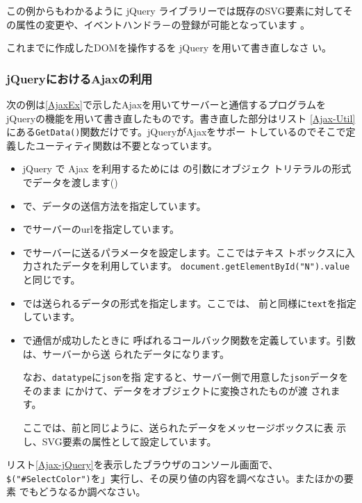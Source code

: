 この例からもわかるように jQuery ライブラリーでは既存のSVG要素に対してそ
の属性の変更や、イベントハンドラ－の登録が可能となっています
\iffalse\footnote{\Operan や\FF で確認したところではSVGの要素を指定して、新規に
オブジェクトを作成することはできますが、それをSVG要素として表示すること
はできませんでした。一部の属性はCSSの方で定義されてしまいました。これは
要素を作成するときの名前空間がHTMLにしか適応していないためと思われま
す。}\fi 。
\begin{Problem}\upshape
 これまでに作成したDOMを操作する\HTML を jQuery を用いて書き直しなさ
 い。
\end{Problem}
\subsubsection{jQueryにおけるAjaxの利用}
次の例は\ref{AjaxEx}で示したAjaxを用いてサーバーと通信するプログラムを
jQueryの機能を用いて書き直したものです。書き直した部分はリスト
\ref{Ajax-Util}にある\texttt{GetData()}関数だけです。jQueryがAjaxをサポー
トしているのでそこで定義したユーティティ関数は不要となっています。

\begin{itemize}
 \item jQuery で Ajax を利用するためには  の引数にオブジェク
			 トリテラルの形式でデータを渡します()
 \item {}で、データの送信方法を指定しています。
 \item {}でサーバーのurlを指定しています。
 \item {}でサーバーに送るパラメータを設定します。ここではテキス
			 トボックスに入力されたデータを利用しています。
			 \texttt{document.getElementById("N").value}と同じです。
 \item {}では送られるデータの形式を指定します。ここでは、
			 前と同様に\texttt{text}を指定しています。

 \item {}で通信が成功したときに
			 呼ばれるコールバック関数を定義しています。引数は、サーバーから送
			 られたデータになります。
			 
			 なお、\texttt{datatype}に\texttt{json}を指
			 定すると、サーバー側で用意した\texttt{json}データをそのまま
			 にかけて、データをオブジェクトに変換されたものが渡
			 されます。

			 ここでは、前と同じように、送られたデータをメッセージボックスに表
			 示し、SVG要素の属性として設定しています。
\end{itemize}
\begin{Problem}\upshape
リスト\ref{Ajax-jQuery}を表示したブラウザのコンソール画面で、
 \texttt{\$("\#SelectColor")}を」実行し、その戻り値の内容を調べなさい。またほかの要素
 でもどうなるか調べなさい。
\end{Problem}

